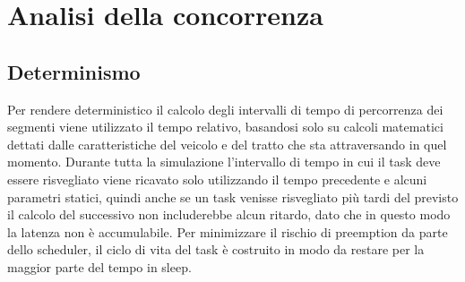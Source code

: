 \chapter{Analisi della concorrenza} %

\label{Chapter4} %



\section{Determinismo}

Per rendere deterministico il calcolo degli intervalli di tempo di percorrenza dei segmenti viene utilizzato il tempo relativo, basandosi solo su calcoli matematici dettati dalle caratteristiche del veicolo e del tratto che sta attraversando in quel momento. Durante tutta la simulazione l’intervallo di tempo in cui il task deve essere risvegliato viene ricavato solo utilizzando il tempo precedente e alcuni parametri statici, quindi anche se un task venisse risvegliato più tardi del previsto il calcolo del successivo non includerebbe alcun ritardo, dato che in questo modo la latenza non è accumulabile.
Per minimizzare il rischio di preemption da parte dello scheduler, il ciclo di vita del task è costruito in modo da restare per la maggior parte del tempo in sleep.

